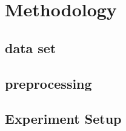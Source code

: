 \section{Methodology}
\subsection{data set}
\subsection{preprocessing}
\subsection{Experiment Setup}
